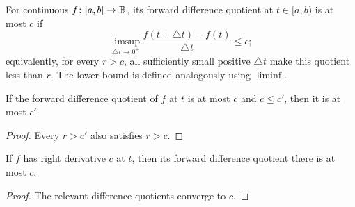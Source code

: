 \begin{definition}
\label{def:forward-difference-quotient}





For continuous $f\colon[a,b]\to\mathbb{R}$, its forward difference quotient
at $t\in[a,b)$ is at most $c$ if
$$\limsup_{\triangle t\to0^+}
\frac{f(t+\triangle t)-f(t)}{\triangle t}\le c;$$
equivalently, for every $r>c$, all sufficiently small positive
$\triangle t$ make this quotient less than $r$. The lower bound is
defined analogously using $\liminf$.
\end{definition}

\begin{lemma}
\label{lem:forward-difference-quotient-mono}





If the forward difference quotient of $f$ at $t$ is at most $c$ and
$c\le c'$, then it is at most $c'$.
\end{lemma}
\begin{proof}
\sketch

Every $r>c'$ also satisfies $r>c$.
\end{proof}

\begin{lemma}
\label{lem:right-derivative-forward-difference-quotient}





If $f$ has right derivative $c$ at $t$, then its forward difference
quotient there is at most $c$.
\end{lemma}
\begin{proof}
\sketch

The relevant difference quotients converge to $c$.
\end{proof}

